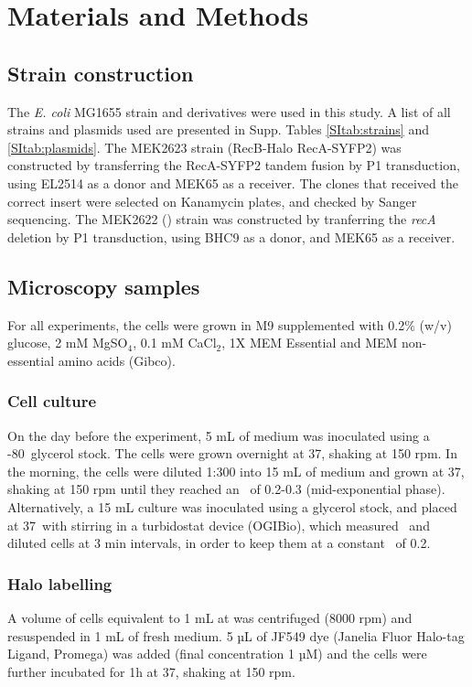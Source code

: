 \section*{Materials and Methods}

\subsection*{Strain construction}
The \textit{E. coli} MG1655 strain and derivatives were used in this study. A list of all strains and plasmids used are presented in Supp. Tables \ref{SItab:strains} and \ref{SItab:plasmids}.
The MEK2623 strain (RecB-Halo RecA-SYFP2) was constructed by transferring the RecA-SYFP2 tandem fusion by P1 transduction, using EL2514\cite{Wiktor2021} as a donor and MEK65\cite{Lepore2019a} as a receiver. The clones that received the correct insert were selected on Kanamycin plates, and checked by Sanger sequencing. The MEK2622 (\dreca) strain was constructed by tranferring the \textit{recA} deletion by P1 transduction, using BHC9 as a donor, and MEK65 as a receiver.

\subsection*{Microscopy samples}
For all experiments, the cells were grown in M9 supplemented with 0.2\% (w/v) glucose, 2 mM MgSO$_4$, 0.1 mM CaCl$_2$, 1X MEM Essential and MEM non-essential amino acids (Gibco).
\subsubsection*{Cell culture}
On the day before the experiment, 5 mL of medium was inoculated using a -80\celsius\ glycerol stock. The cells were grown overnight at 37\celsius, shaking at 150 rpm. In the morning, the cells were diluted 1:300 into 15 mL of medium and grown at 37\celsius, shaking at 150 rpm until they reached an \od\ of 0.2-0.3 (mid-exponential phase).
Alternatively, a 15 mL culture was inoculated using a glycerol stock, and placed at 37\celsius\ with stirring in a turbidostat device (OGIBio), which measured \od\ and diluted cells at 3 min intervals, in order to keep them at a constant \od\ of 0.2.
\subsubsection*{Halo labelling}
A volume of cells equivalent to 1 mL at  was centrifuged (8000 rpm) and resuspended in 1 mL of fresh medium. 5 µL of JF549 dye (Janelia Fluor Halo-tag Ligand, Promega) was added (final concentration 1 µM) and the cells were further incubated for 1h at 37\celsius, shaking at 150 rpm.

